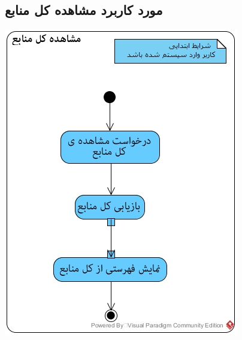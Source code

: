 \documentclass{article}
\begin{document}
\subsection*{مورد کاربرد مشاهده کل منابع}
\vspace{1cm}
\begin{center}
\includegraphics[width=\textwidth]{ActivityDiagrams/35.jpg}
\end{center}

\newpage
\vspace{1cm}
\end{document}
